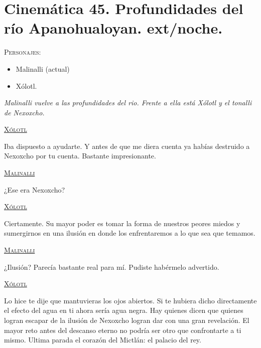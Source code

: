 \section{Cinemática 45. Profundidades del río Apanohualoyan. ext/noche. }
\label{Cin:Cinematica45}
 \textsc{Personajes}:
 \begin{itemize}
 \item Malinalli (actual)
\item Xólotl.

 \end{itemize}
\textit{Malinalli vuelve a las profundidades del rio. Frente a ella está Xólotl y el tonalli de Nexoxcho.}
\begin{center}
\textsc{\underline{Xólotl}}
\\
\par
Iba dispuesto a ayudarte.  Y antes de que me diera cuenta ya habías destruido a Nexoxcho por tu cuenta. Bastante impresionante.
\\
\par
\textsc{\underline{Malinalli}}
\\
\par
¿Ese era Nexoxcho?
\\
\par
\textsc{\underline{Xólotl}}
\\
\par
Ciertamente. Su mayor poder es tomar la forma de nuestros peores miedos y sumergirnos en una ilusión en donde los enfrentaremos a lo que sea que temamos.
\\
\par
\textsc{\underline{Malinalli}}
\\
\par
¿Ilusión? Parecía bastante real para mí. Pudiste habérmelo advertido.
\\
\par
\textsc{\underline{Xólotl}}
\\
\par
Lo hice te dije que mantuvieras los ojos abiertos. Si te hubiera dicho directamente el efecto del agua en ti ahora sería agua negra. Hay quienes dicen que quienes logran escapar de la ilusión de Nexoxcho logran dar con una gran revelación. El mayor reto antes del descanso eterno no podría ser otro que confrontarte a ti mismo. Ultima parada el corazón del Mictlán: el palacio del rey.  
\end{center}
